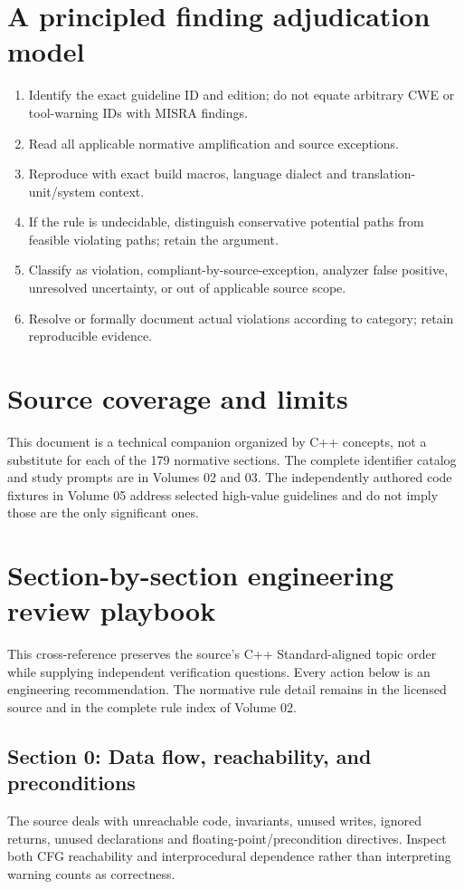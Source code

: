 \documentclass[10pt,letterpaper]{article}
\begin{document}
\section{A principled finding adjudication model}
\begin{enumerate}
\item Identify the exact guideline ID and edition; do not equate arbitrary CWE or tool-warning IDs with MISRA findings.
\item Read all applicable normative amplification and source exceptions.
\item Reproduce with exact build macros, language dialect and translation-unit/system context.
\item If the rule is undecidable, distinguish conservative potential paths from feasible violating paths; retain the argument.
\item Classify as violation, compliant-by-source-exception, analyzer false positive, unresolved uncertainty, or out of applicable source scope.
\item Resolve or formally document actual violations according to category; retain reproducible evidence.
\end{enumerate}

\section{Source coverage and limits}
This document is a technical companion organized by C++ concepts, not a substitute for each of the 179 normative sections. The complete identifier catalog and study prompts are in Volumes 02 and 03. The independently authored code fixtures in Volume 05 address selected high-value guidelines and do not imply those are the only significant ones.


\section{Section-by-section engineering review playbook}
This cross-reference preserves the source's C++ Standard-aligned topic order while supplying independent verification questions. Every action below is an engineering recommendation. The normative rule detail remains in the licensed source and in the complete rule index of Volume 02.


\subsection{Section 0: Data flow, reachability, and preconditions}
The source deals with unreachable code, invariants, unused writes, ignored returns, unused declarations and floating-point/precondition directives. Inspect both CFG reachability and interprocedural dependence rather than interpreting warning counts as correctness.
\end{document}
